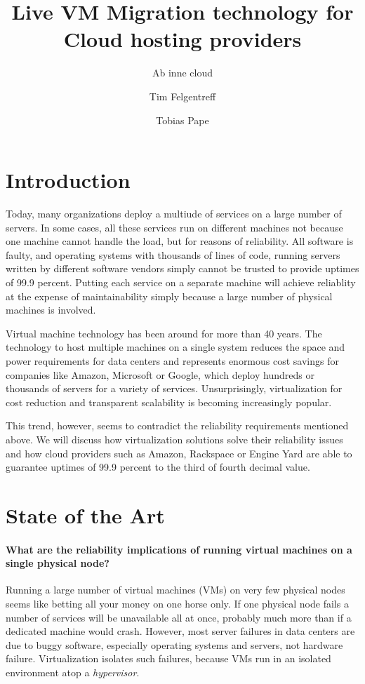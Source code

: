 \documentclass{scrartcl}
\title{Live VM Migration technology for Cloud hosting providers}
\subtitle{Ab inne cloud}
\author{Tim Felgentreff \and Tobias Pape}
\begin{document}
\maketitle
\tableofcontents

\section{Introduction}
\label{sec:introduction}
Today, many organizations deploy a multiude of services on a large
number of servers. In some cases, all these services run on different
machines not because one machine cannot handle the load, but for
reasons of reliability.  All software is faulty\cite{Zeller2006}, and
operating systems with thousands of lines of code, running servers
written by different software vendors simply cannot be trusted to
provide uptimes of 99.9 percent. Putting each service on a separate
machine will achieve reliablity at the expense of maintainability
simply because a large number of physical machines is involved.

Virtual machine technology has been around for more than 40
years\cite{tanenbaum1992modern}. The technology to host multiple
machines on a single system reduces the space and power requirements
for data centers and represents enormous cost savings for companies
like Amazon, Microsoft or Google, which deploy hundreds or thousands
of servers for a variety of services. Unsurprisingly, virtualization
for cost reduction and transparent scalability is becoming
increasingly popular.

This trend, however, seems to contradict the reliability requirements
mentioned above. We will discuss how virtualization solutions solve
their reliability issues and how cloud providers such as Amazon,
Rackspace or Engine Yard are able to guarantee uptimes of 99.9 percent
to the third of fourth decimal value.

\section{State of the Art}
\label{sec:sota}

\paragraph{What are the reliability implications of running virtual machines on a single
physical node?}

Running a large number of virtual machines (VMs) on very few physical
nodes seems like betting all your money on one horse only. If one
physical node fails a number of services will be unavailable all at
once, probably much more than if a dedicated machine would
crash. However, most server failures in data centers are due to buggy
software, especially operating systems and servers, not hardware
failure. Virtualization isolates such failures, because VMs run in an
isolated environment atop a \emph{hypervisor}.
\end{document}
